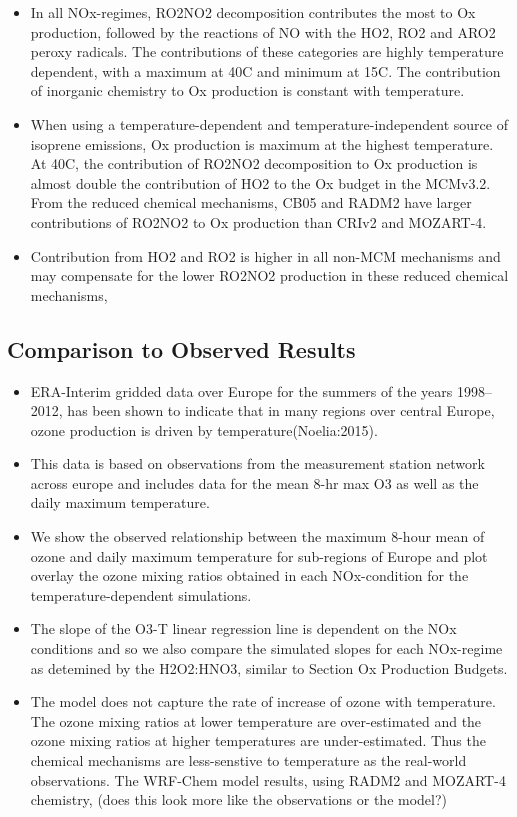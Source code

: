 \documentclass[11pt,a4paper]{article}
\begin{document}
\begin{itemize}
    \item In all NOx-regimes, RO2NO2 decomposition contributes the most to Ox production, followed by the reactions of NO with the HO2, RO2 and ARO2 peroxy radicals. The contributions of these categories are highly temperature dependent, with a maximum at 40C and minimum at 15C. The contribution of inorganic chemistry to Ox production is constant with temperature.
    \item When using a temperature-dependent and temperature-independent source of isoprene emissions, Ox production is maximum at the highest temperature. At 40C, the contribution of RO2NO2 decomposition to Ox production is almost double the contribution of HO2 to the Ox budget in the MCMv3.2. From the reduced chemical mechanisms, CB05 and RADM2 have larger contributions of RO2NO2 to Ox production than CRIv2 and MOZART-4.
    \item Contribution from HO2 and RO2 is higher in all non-MCM mechanisms and may compensate for the lower RO2NO2 production in these reduced chemical mechanisms, 
\end{itemize}

\subsection{Comparison to Observed Results}
\begin{itemize}
    \item ERA-Interim gridded data over Europe for the summers of the years 1998--2012, has been shown to indicate that in many regions over central Europe, ozone production is driven by temperature(Noelia:2015).
    \item This data is based on observations from the measurement station network across europe and includes data for the mean 8-hr max O3 as well as the daily maximum temperature.
    \item We show the observed relationship between the maximum 8-hour mean of ozone and daily maximum temperature for sub-regions of Europe and plot overlay the ozone mixing ratios obtained in each NOx-condition for the temperature-dependent simulations.
    \item The slope of the O3-T linear regression line is dependent on the NOx conditions and so we also compare the simulated slopes for each NOx-regime as detemined by the H2O2:HNO3, similar to Section Ox Production Budgets.
    \item The model does not capture the rate of increase of ozone with temperature. The ozone mixing ratios at lower temperature are over-estimated and the ozone mixing ratios at higher temperatures are under-estimated. Thus the chemical mechanisms are less-senstive to temperature as the real-world observations. The WRF-Chem model results, using RADM2 and MOZART-4 chemistry, (does this look more like the observations or the model?)
\end{itemize}
\end{document}
